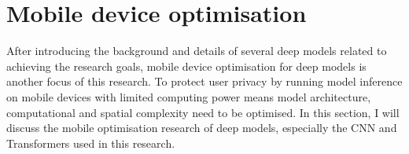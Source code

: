 \section{Mobile device optimisation}
\label{sec:Mobile device optimisation}
After introducing the background and details of several deep models related to achieving the research goals, mobile device optimisation for deep models is another focus of this research.
To protect user privacy by running model inference on mobile devices with limited computing power means model architecture, computational and spatial complexity need to be optimised.
In this section, I will discuss the mobile optimisation research of deep models, especially the CNN and Transformers used in this research.



